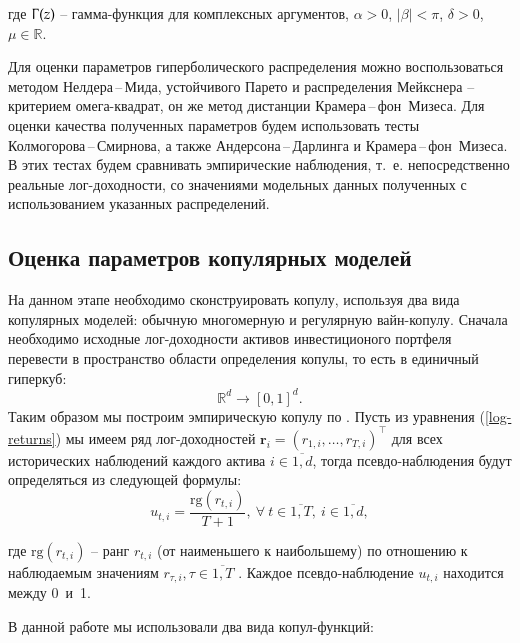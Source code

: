 \noindent где $\Upgamma(z)$ -- гамма-функция для комплексных аргументов, $\alpha > 0$, $|\beta| < \pi$, $\delta > 0$, $\mu \in \mathbb{R}$.

Для оценки параметров гиперболического распределения можно воспользоваться методом Нелдера\,--\,Мида, устойчивого Парето и распределения Мейкснера -- критерием омега-квадрат, он же метод дистанции Крамера\,--\,фон~Мизеса. 
Для оценки качества полученных параметров будем использовать тесты Колмогорова\,--\,Смирнова, а также Андерсона\,--\,Дарлинга и Крамера\,--\,фон~Мизеса. 
В этих тестах будем сравнивать эмпирические наблюдения, т.~е. непосредственно реальные лог-доходности, со значениями модельных данных полученных с использованием указанных распределений.


\subsection{Оценка параметров копулярных моделей}
\label{methodology:copula}

На данном этапе необходимо сконструировать копулу, используя два вида копулярных моделей: обычную многомерную и регулярную вайн-копулу. 
Сначала необходимо исходные лог-доходности активов инвестиционого портфеля перевести в пространство области определения копулы, то есть в единичный гиперкуб: $$\mathbb{R}^d \to [0, 1]^d.$$ Таким образом мы построим  эмпирическую копулу по  . 
Пусть из уравнения (\ref{log-returns}) мы имеем ряд лог-доходностей $\boldsymbol{r}_i = (r_{1,i}, \ldots, r_{T,i})^\intercal$ для всех исторических наблюдений каждого актива $i \in \overline{1,d}$, тогда псевдо-наблюдения будут определяться из следующей формулы:
%
\begin{equation} \label{pobs}
    u_{t,i} = \frac{\text{rg}(r_{t,i})}{T + 1},\ \forall \ t \in \overline{1,T},\ i \in \overline{1,d},
\end{equation}

\noindent где $\text{rg}(r_{t,i})$ -- ранг $r_{t,i}$ (от наименьшего к наибольшему) по отношению к наблюдаемым значениям $r_{\tau,i}, \tau \in \overline{1,T}$ \cite{Copula}. Каждое псевдо-наблюдение $u_{t,i}$ находится между 0~и~1.

В данной работе мы использовали два вида копул-функций:

